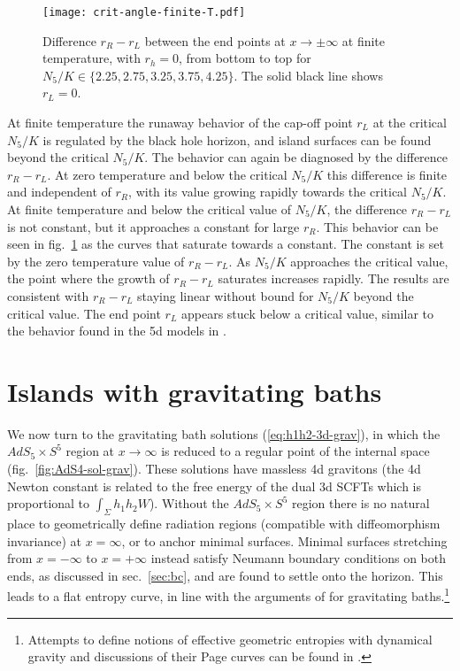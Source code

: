 \documentclass[aps,prd,11pt,notitlepage,longbibliography,nofootinbib,tightenlines,preprintnumbers]{revtex4-1}
\begin{document}
\begin{figure}
	\texttt{[image: crit-angle-finite-T.pdf]}
	\caption{Difference $r_R-r_L$ between the end points at $x\rightarrow\pm\infty$ at finite temperature, with $r_h=0$, from bottom to top for $N_5/K\in\lbrace 2.25,2.75,3.25,3.75,4.25\rbrace$. The solid black line shows $r_L=0$.\label{fig:crit-ang-T}
	}	
\end{figure}



At finite temperature the runaway behavior of the cap-off point $r_L$ at the critical $N_5/K$ is regulated by the black hole horizon, and island surfaces can be found beyond the critical $N_5/K$.
The behavior can again be diagnosed by the difference $r_R-r_L$.
At zero temperature and below the critical $N_5/K$ this difference is finite and independent of $r_R$, with its value growing rapidly towards the critical $N_5/K$.
At finite temperature and below the critical value of $N_5/K$, the difference $r_R-r_L$ is not constant, but it approaches a constant for large $r_R$. 
This behavior can be seen in fig.~\ref{fig:crit-ang-T} as the curves that saturate towards a constant.
The constant is set by the zero temperature value of $r_R-r_L$.
As $N_5/K$ approaches the critical value, the point where the growth of $r_R-r_L$ saturates increases rapidly. 
The results are consistent with $r_R-r_L$ staying linear without bound for $N_5/K$ beyond the critical value.
The end point $r_L$ appears stuck below a critical value, similar to the behavior found in the 5d models in \cite{Geng:2020fxl}.




\section{Islands with gravitating baths}\label{sec:grav-bath}

We now turn to the gravitating bath solutions (\ref{eq:h1h2-3d-grav}), in which the $AdS_5\times S^5$ region at $x\rightarrow\infty$ is reduced to a regular point of the internal space (fig.~\ref{fig:AdS4-sol-grav}).
These solutions have massless 4d gravitons (the 4d Newton constant is related to the free energy of the dual 3d SCFTs which is proportional to $\int_\Sigma h_1 h_2 W$).
Without the $AdS_5\times S^5$ region there is no natural place to geometrically define radiation regions (compatible with diffeomorphism invariance)  at $x=\infty$, or to anchor minimal surfaces. 
Minimal surfaces stretching from $x=-\infty$ to $x=+\infty$ instead satisfy Neumann boundary conditions on both ends, as discussed in sec.~\ref{sec:bc}, and are found to settle onto the horizon. This leads to a flat entropy curve, in line with the arguments of \cite{Laddha:2020kvp} for gravitating baths.\footnote{Attempts to define notions of effective geometric entropies with dynamical gravity and discussions of their Page curves can be found in \cite{Krishnan:2020oun,Dong:2020uxp,Krishnan:2020fer}.}
\end{document}
